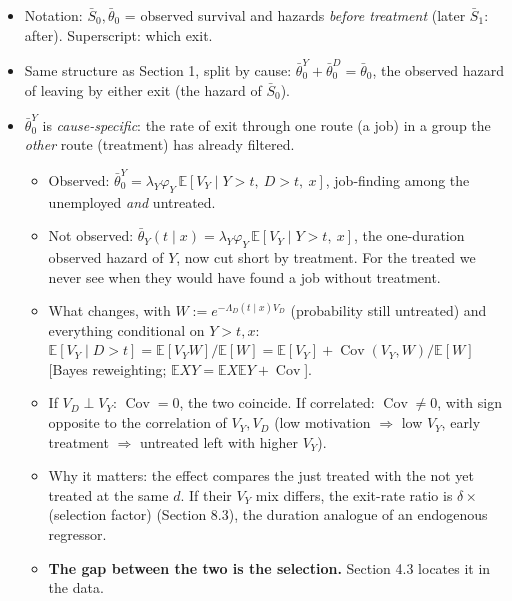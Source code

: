 \documentclass[11pt]{article}
\newcommand{\E}{\mathbb{E}}
\newcommand{\1}{\mathbf{1}}
\newcommand{\cov}{\operatorname{Cov}}
\begin{document}
\begin{itemize}
  \item Notation: $\bar S_0,\bar\theta_0$ = observed survival and hazards \emph{before treatment} (later $\bar S_1$: after). Superscript: which exit.
  \item Same structure as Section 1, split by cause: $\bar\theta^Y_0+\bar\theta^D_0=\bar\theta_0$, the observed hazard of leaving by either exit (the hazard of $\bar S_0$).
  \item $\bar\theta^Y_0$ is \emph{cause-specific}: the rate of exit through one route (a job) in a group the \emph{other} route (treatment) has already filtered.
    \begin{itemize}
      \item Observed: $\bar\theta^Y_0=\lambda_Y\varphi_Y\,\E[V_Y\mid Y>t,\ D>t,\ x]$, job-finding among the unemployed \emph{and} untreated.
      \item Not observed: $\bar\theta_Y(t\mid x)=\lambda_Y\varphi_Y\,\E[V_Y\mid Y>t,\ x]$, the one-duration observed hazard of $Y$, now cut short by treatment. For the treated we never see when they would have found a job without treatment.
      \item What changes, with $W:=e^{-\Lambda_D(t\mid x)V_D}$ (probability still untreated) and everything conditional on $Y>t,x$: $\E[V_Y\mid D>t]=\E[V_YW]/\E[W]=\E[V_Y]+\cov(V_Y,W)/\E[W]$ [Bayes reweighting; $\E XY=\E X\E Y+\cov$].
      \item If $V_D\perp V_Y$: $\cov=0$, the two coincide. If correlated: $\cov\neq0$, with sign opposite to the correlation of $V_Y,V_D$ (low motivation $\Rightarrow$ low $V_Y$, early treatment $\Rightarrow$ untreated left with higher $V_Y$).
      \item Why it matters: the effect compares the just treated with the not yet treated at the same $d$. If their $V_Y$ mix differs, the exit-rate ratio is $\delta\times$(selection factor) (Section 8.3), the duration analogue of an endogenous regressor.
      \item \textbf{The gap between the two is the selection.} Section 4.3 locates it in the data.
    \end{itemize}
\end{itemize}
\end{document}
